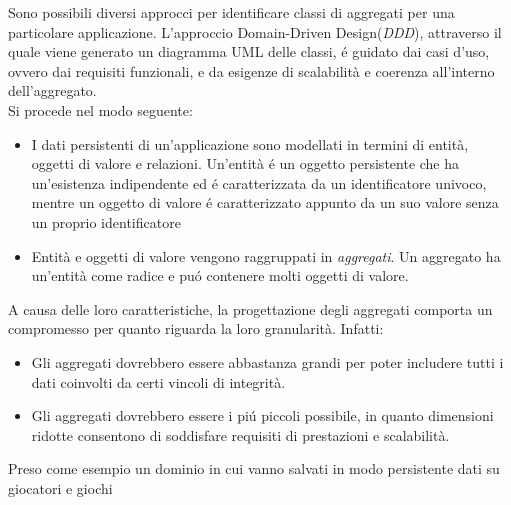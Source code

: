 Sono possibili diversi approcci per identificare classi di aggregati per una particolare applicazione.
L'approccio Domain-Driven Design(\emph{DDD}), attraverso il quale viene generato un diagramma UML delle classi,
é guidato dai casi d'uso, ovvero dai requisiti funzionali, e da esigenze di scalabilità e coerenza all'interno dell'aggregato.\\
Si procede nel modo seguente:
\begin{itemize}
    \item I dati persistenti di un'applicazione sono modellati in termini di entità, oggetti di valore e
    relazioni.
    Un'entità é un oggetto persistente che ha un'esistenza indipendente ed é caratterizzata da un identificatore
    univoco, mentre un oggetto di valore é caratterizzato appunto da un suo valore senza un proprio identificatore
    \item Entità e oggetti di valore vengono raggruppati in \emph{aggregati}.
    Un aggregato ha un'entità come radice e puó contenere molti oggetti di valore.
\end{itemize}
A causa delle loro caratteristiche, la progettazione degli aggregati comporta un compromesso per quanto riguarda
la loro granularità.
Infatti:
\begin{itemize}
    \item Gli aggregati dovrebbero essere abbastanza grandi per poter includere tutti i dati coinvolti da
    certi vincoli di integrità.
    \item Gli aggregati dovrebbero essere i piú piccoli possibile, in quanto dimensioni ridotte consentono di
    soddisfare requisiti di prestazioni e scalabilità.
\end{itemize}
Preso come esempio un dominio in cui vanno salvati in modo persistente dati su giocatori e giochi

